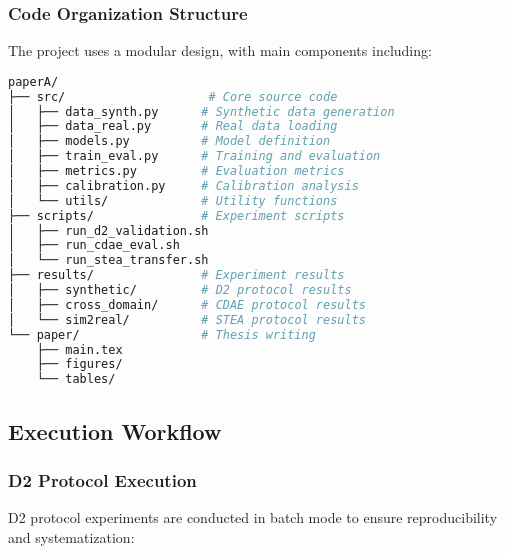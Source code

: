 \subsubsection{Code Organization Structure}
The project uses a modular design, with main components including:

\begin{lstlisting}[language=bash,caption=Project Code Structure]
paperA/
├── src/                    # Core source code
│   ├── data_synth.py      # Synthetic data generation
│   ├── data_real.py       # Real data loading
│   ├── models.py          # Model definition
│   ├── train_eval.py      # Training and evaluation
│   ├── metrics.py         # Evaluation metrics
│   ├── calibration.py     # Calibration analysis
│   └── utils/             # Utility functions
├── scripts/               # Experiment scripts
│   ├── run_d2_validation.sh
│   ├── run_cdae_eval.sh
│   └── run_stea_transfer.sh
├── results/               # Experiment results
│   ├── synthetic/         # D2 protocol results
│   ├── cross_domain/      # CDAE protocol results
│   └── sim2real/          # STEA protocol results
└── paper/                 # Thesis writing
    ├── main.tex
    ├── figures/
    └── tables/
\end{lstlisting}

\subsection{Execution Workflow}
\label{subsec:execution_workflow}

\subsubsection{D2 Protocol Execution}
D2 protocol experiments are conducted in batch mode to ensure reproducibility and systematization:

